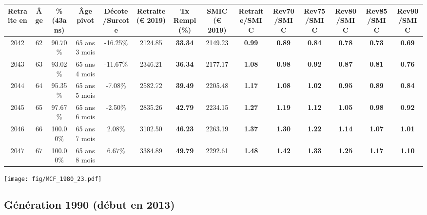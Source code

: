 \begin{adjustbox}{max width=\textwidth} 
\begin{tabular}[htb]{|c|c||c|c|c||c|c||c||c|c|c|c|c|c|} 
\hline 
 Retraite en &  Âge &  \%(43ans) &  Âge pivot &  Décote/Surcote &  Retraite (\euro{} 2019) &  Tx Rempl(\%) &  SMIC (\euro{} 2019) &  Retraite/SMIC &  Rev70/SMIC &  Rev75/SMIC &  Rev80/SMIC &  Rev85/SMIC &  Rev90/SMIC \\ 
\hline \hline 
 2042 &  62 &  90.70\% &  65 ans 3 mois &  -16.25\% &  2124.85 &  {\bf 33.34} &  2149.23 &  {\bf {\color{red} 0.99}} &  {\bf {\color{red} 0.89}} &  {\bf {\color{red} 0.84}} &  {\bf {\color{red} 0.78}} &  {\bf {\color{red} 0.73}} &  {\bf {\color{red} 0.69}} \\ 
\hline 
 2043 &  63 &  93.02\% &  65 ans 4 mois &  -11.67\% &  2346.21 &  {\bf 36.34} &  2177.17 &  {\bf 1.08} &  {\bf {\color{red} 0.98}} &  {\bf {\color{red} 0.92}} &  {\bf {\color{red} 0.87}} &  {\bf {\color{red} 0.81}} &  {\bf {\color{red} 0.76}} \\ 
\hline 
 2044 &  64 &  95.35\% &  65 ans 5 mois &  -7.08\% &  2582.72 &  {\bf 39.49} &  2205.48 &  {\bf 1.17} &  {\bf 1.08} &  {\bf 1.02} &  {\bf {\color{red} 0.95}} &  {\bf {\color{red} 0.89}} &  {\bf {\color{red} 0.84}} \\ 
\hline 
 2045 &  65 &  97.67\% &  65 ans 6 mois &  -2.50\% &  2835.26 &  {\bf 42.79} &  2234.15 &  {\bf 1.27} &  {\bf 1.19} &  {\bf 1.12} &  {\bf 1.05} &  {\bf {\color{red} 0.98}} &  {\bf {\color{red} 0.92}} \\ 
\hline 
 2046 &  66 &  100.00\% &  65 ans 7 mois &  2.08\% &  3102.50 &  {\bf 46.23} &  2263.19 &  {\bf 1.37} &  {\bf 1.30} &  {\bf 1.22} &  {\bf 1.14} &  {\bf 1.07} &  {\bf 1.01} \\ 
\hline 
 2047 &  67 &  100.00\% &  65 ans 8 mois &  6.67\% &  3384.89 &  {\bf 49.79} &  2292.61 &  {\bf 1.48} &  {\bf 1.42} &  {\bf 1.33} &  {\bf 1.25} &  {\bf 1.17} &  {\bf 1.10} \\ 
\hline 
\hline 
\end{tabular} 
\end{adjustbox} 
 
 \vspace{0.1cm} 

 \begin{center}\texttt{[image: fig/MCF\_1980\_23.pdf]}\end{center} \label{fig/MCF_1980_23.pdf} 

\newpage 
 
\subsection{Génération 1990 (début en 2013)} 

